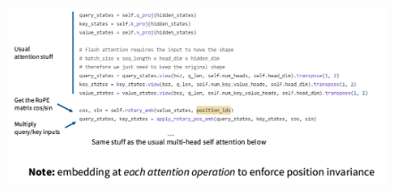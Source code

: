 \documentclass{article}
\begin{document}
\begin{figure}[!h]
	\centering
	\includegraphics[scale=0.4]{imgs/rope-code.png}
\end{figure}

\clearpage
 

\newpage
\appendix
\end{document}
